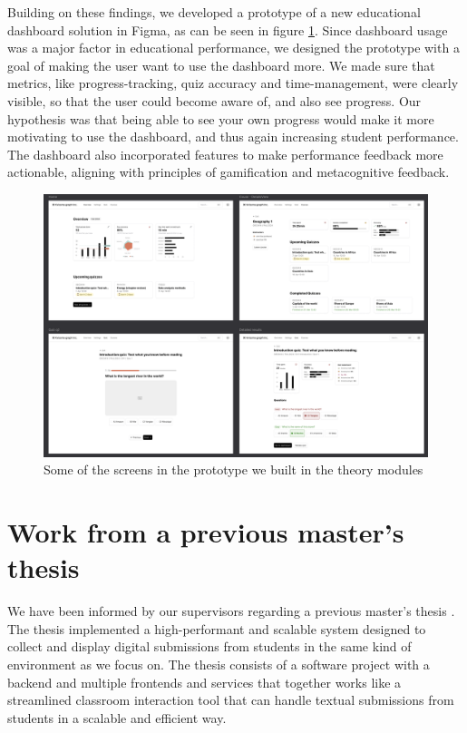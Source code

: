 Building on these findings, we developed a prototype of a new educational dashboard solution in Figma, as can be seen in figure \ref{fig:previous-work-theory-modules-prototype}. Since dashboard usage was a major factor in educational performance, we designed the prototype with a goal of making the user want to use the dashboard more. We made sure that metrics, like progress-tracking, quiz accuracy and time-management, were clearly visible, so that the user could become aware of, and also see progress. Our hypothesis was that being able to see your own progress would make it more motivating to use the dashboard, and thus again increasing student performance. The dashboard also incorporated features to make performance feedback more actionable, aligning with principles of gamification and metacognitive feedback.

\begin{figure}[h!]
    \centering
    \includegraphics[width=1\linewidth]{figures//c5/previous-work.png}
    \caption{Some of the screens in the prototype we built in the theory modules \cite{theoryModule3}}
    \label{fig:previous-work-theory-modules-prototype}
\end{figure}

\section{Work from a previous master's thesis}
We have been informed by our supervisors regarding a previous master's thesis \cite{Olsen2024}. The thesis implemented a high-performant and scalable system designed to collect and display digital submissions from students in the same kind of environment as we focus on. The thesis consists of a software project with a backend and multiple frontends and services that together works like a streamlined classroom interaction tool that can handle textual submissions from students in a scalable and efficient way.

